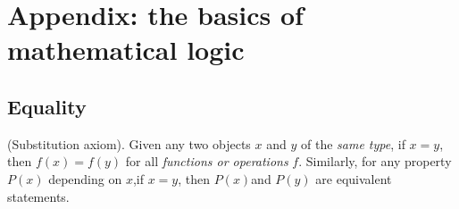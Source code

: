 \renewcommand\thechapter{\Alph{chapter}}
\setcounter{chapter}{0}
\chapter{Appendix: the basics of mathematical logic}\label{ch a}

\setcounter{section}{6}
\section{Equality}\label{section a.7}

\setcounter{axiom}{3}
\begin{axiom} \label{axm a.7.4}
(Substitution axiom). Given any two objects \(x\) and \(y\) of the \emph{same type}, if \(x = y\), then \(f(x)= f(y)\) for all \emph{functions or operations} \(f\). Similarly, for any property \(P(x)\) depending on \(x\),if \(x = y\), then \(P(x)\)and \(P(y)\) are equivalent statements.
\end{axiom}